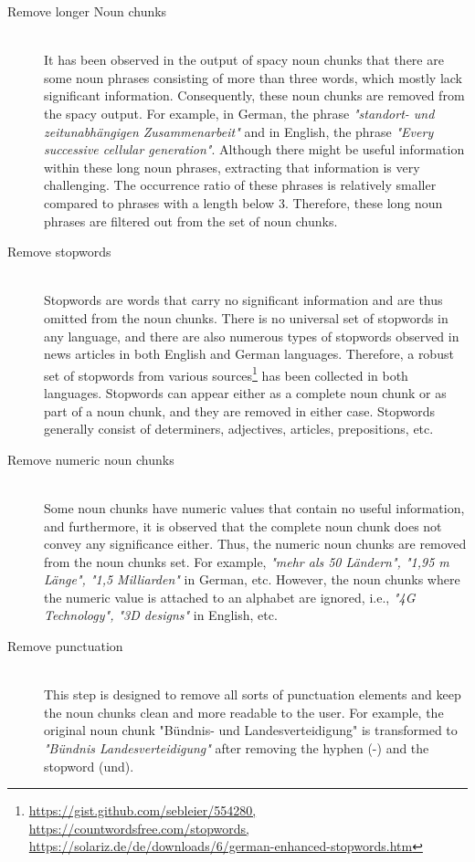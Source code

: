  
 \begin{description}
 	\item[Remove longer Noun chunks] \hfill \\  It has been observed in the output of spacy noun chunks that there are some  noun phrases consisting of more than three words, which mostly lack significant information. Consequently, these noun chunks are removed from the spacy output. For example, in German, the phrase \emph{"standort- und zeitunabhängigen Zusammenarbeit"} and in English, the phrase \emph{"Every successive cellular generation"}. Although there might be useful information within these long noun phrases, extracting that information is very challenging. The occurrence ratio of these phrases is relatively smaller compared to phrases with a length below 3. Therefore, these long noun phrases are filtered out from the set of noun chunks.
 	
 	\item[Remove stopwords] \hfill \\  Stopwords are words that carry no significant information and are thus omitted from the noun chunks. There is no universal set of stopwords in any language, and there are also numerous types of stopwords observed in news articles in both English and German languages. Therefore, a robust set of stopwords from various sources\footnote{\url{https://gist.github.com/sebleier/554280, https://countwordsfree.com/stopwords, https://solariz.de/de/downloads/6/german-enhanced-stopwords.htm}} has been collected in both languages. Stopwords can appear either as a complete noun chunk or as part of a noun chunk, and they are removed in either case. Stopwords generally consist of determiners, adjectives, articles, prepositions, etc.
 	
 	
 	\item[Remove numeric noun chunks] \hfill \\  Some noun chunks have numeric values that contain no useful information, and furthermore, it is observed that the complete noun chunk does not convey any significance either. Thus, the numeric noun chunks are removed from the noun chunks set. For example, \emph{"mehr als 50 Ländern", "1,95 m Länge", "1,5 Milliarden"} in German, etc. However, the noun chunks where the numeric value is attached to an alphabet are ignored, i.e., \emph{"4G Technology", "3D designs"} in English, etc.
 	
 	
 	\item[Remove punctuation]  \hfill \\ This step is designed to remove all sorts of punctuation elements and keep the noun chunks clean and more readable to the user. For example, the original noun chunk "Bündnis- und Landesverteidigung" is transformed to \emph{"Bündnis Landesverteidigung"} after removing the hyphen (-) and the stopword (und).
 	

\end{description}
